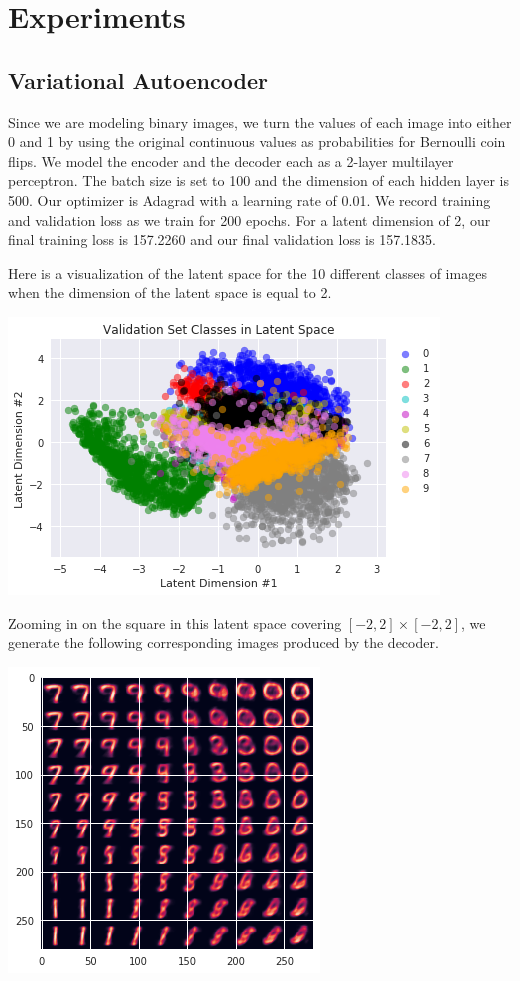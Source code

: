 \documentclass[11pt]{article}
\begin{document}
\section{Experiments}

\subsection{Variational Autoencoder}
Since we are modeling binary images, we turn the values of each image into either 0 and 1 by using the original continuous values as probabilities for Bernoulli coin flips.  We model the encoder and the decoder each as a 2-layer multilayer perceptron.  The batch size is set to 100 and the dimension of each hidden layer is 500.  Our optimizer is Adagrad with a learning rate of 0.01.  We record training and validation loss as we train for 200 epochs.  For a latent dimension of 2, our final training loss is 157.2260 and our final validation loss is 157.1835.  

Here is a visualization of the latent space for the 10 different classes of images when the dimension of the latent space is equal to 2.
\begin{center}
\includegraphics[scale=0.7]{vae1.png}
\end{center} 

Zooming in on the square in this latent space covering $[-2, 2] \times [-2, 2]$, we generate the following corresponding images produced by the decoder.  
 \begin{center}
\includegraphics[scale=0.7]{vae2.png}
\end{center} 
\end{document}
